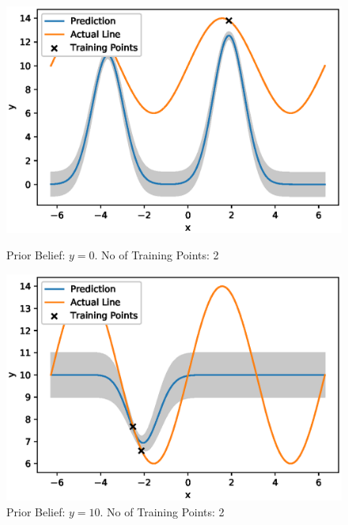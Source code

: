 \begin{figure}[H]
\centering
\begin{minipage}{.5\textwidth}
  \centering
        \includegraphics[width=\textwidth]{images/GP_Explanation/zero_const_mean_2_training.eps}
        
        \caption{Prior Belief: $y=0$. No of Training Points: 2}
        \label{fig:gp_plot_y0_2}
\end{minipage}%
\begin{minipage}{.5\textwidth}
  \centering
        \includegraphics[width=\textwidth]{images/GP_Explanation/10_const_mean_2_training.eps}
        \caption{Prior Belief: $y=10$. No of Training Points: 2}
        \label{fig:gp_plot_y10_2}
\end{minipage}
\end{figure}


